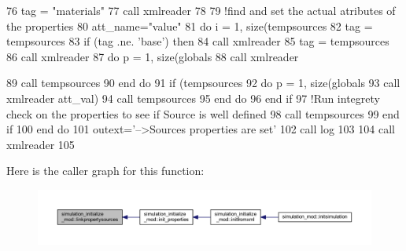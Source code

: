 \begin{DoxyCode}
76     tag = \textcolor{stringliteral}{"materials"}
77     \textcolor{keyword}{call }xmlreader%
78 
79     \textcolor{comment}{!find and set the actual atributes of the properties}
80     att\_name=\textcolor{stringliteral}{"value"}
81     \textcolor{keywordflow}{do} i = 1, \textcolor{keyword}{size}(tempsources%
82         tag = tempsources%
83         \textcolor{keywordflow}{if} (tag .ne. \textcolor{stringliteral}{'base'}) \textcolor{keywordflow}{then}
84         \textcolor{keyword}{call }xmlreader%
85         tag = tempsources%
86         \textcolor{keyword}{call }xmlreader%
87         \textcolor{keywordflow}{do} p = 1, \textcolor{keyword}{size}(globals%
88             \textcolor{keyword}{call }xmlreader%
         
89             \textcolor{keyword}{call }tempsources%
90 \textcolor{keywordflow}{        end do}
91         \textcolor{keywordflow}{if} (tempsources%
92             \textcolor{keywordflow}{do} p = 1, \textcolor{keyword}{size}(globals%
93                 \textcolor{keyword}{call }xmlreader%
      att\_val)
94                 \textcolor{keyword}{call }tempsources%
95 \textcolor{keywordflow}{            end do}
96 \textcolor{keywordflow}{        end if}
97         \textcolor{comment}{!Run integrety check on the properties to see if Source is well defined}
98         \textcolor{keyword}{call }tempsources%
99 \textcolor{keywordflow}{        end if}
100 \textcolor{keywordflow}{    end do}
101     outext=\textcolor{stringliteral}{'-->Sources properties are set'}
102     \textcolor{keyword}{call }log%
103     
104     \textcolor{keyword}{call }xmlreader%
105 
\end{DoxyCode}
Here is the caller graph for this function\+:\nopagebreak
\begin{figure}[H]
\begin{center}
\leavevmode
\includegraphics[width=350pt]{namespacesimulation__initialize__mod_a695ed61242e902d50bc40b83a6d11f65_icgraph}
\end{center}
\end{figure}
